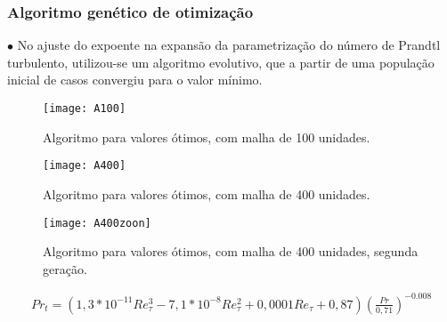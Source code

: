 \documentclass[xcolor=dvipsnames,10pt,aspectratio=169]{beamer}
\begin{document}
	
	
	
			\begin{frame}
	\frametitle{Algoritmo genético de otimização}
	$\bullet$ No ajuste do expoente na expansão da parametrização do número de Prandtl turbulento, utilizou-se um algoritmo evolutivo, que a partir de uma população inicial de casos convergiu para o valor mínimo.\\ 
	\begin{minipage}[h!]{0.24\textwidth}
		\begin{figure}
			\centering
			\texttt{[image: A100]}
			\caption{Algoritmo para valores ótimos, com malha de 100 unidades.}
		\end{figure}
	\end{minipage}\hfill
	\begin{minipage}[h!]{0.24\textwidth}
		\begin{figure}
			\centering
			\texttt{[image: A400]}
			\caption{Algoritmo para valores ótimos, com malha de 400 unidades.}
		\end{figure}
	\end{minipage}\hfill
\begin{minipage}[h!]{0.24\textwidth}
	\begin{figure}
		\centering
		\texttt{[image: A400zoon]}
		\caption{Algoritmo para valores ótimos, com malha de 400 unidades, segunda geração.}
	\end{figure}
\end{minipage}	
	\begin{equation}
\begin{split}
Pr_t = \left( 1,3 * 10^{-11} Re_\tau^3 - 7,1 * 10^{-8} Re_\tau^2 + 0,0001 Re_\tau + 0,87 \right) \left(  \frac{Pr}{0,71}\right) ^{-0.008}
\end{split}
\end{equation}	
\end{frame}	
	
	
	
	
	
	
	
	
	
\end{document}
